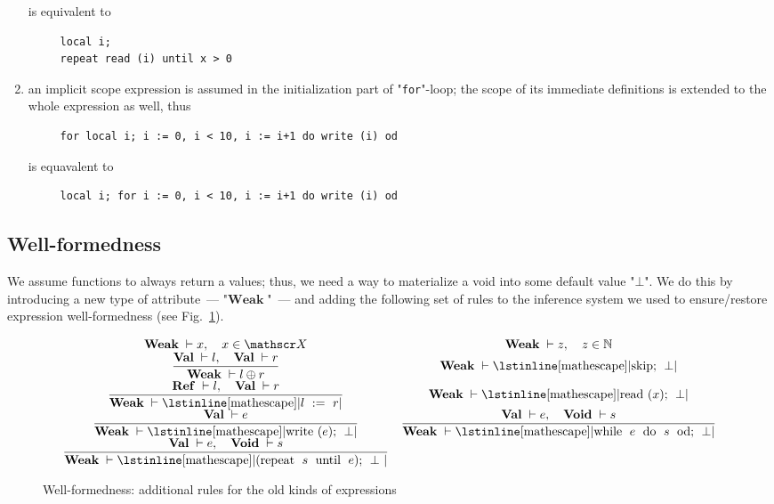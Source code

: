 \documentclass{article}
\newcommand{\trule}[2]{\dfrac{#1}{#2}}
\newcommand{\withenv}[2]{{#1}\vdash{#2}}
\newcommand{\llang}[1]{\mbox{\lstinline[mathescape]|#1|}}
\newcommand{\primi}[2]{\mathbf{#1}\;{#2}}
\theoremstyle{definition}
\begin{document}
\begin{enumerate}
  is equivalent to

  \begin{lstlisting}
     local i;
     repeat read (i) until x > 0
  \end{lstlisting}

\item an implicit scope expression is assumed in the initialization part of "\lstinline|for|"-loop; the scope of its immediate definitions
  is extended to the whole expression as well, thus

  \begin{lstlisting}
     for local i; i := 0, i < 10, i := i+1 do write (i) od
  \end{lstlisting}

  is equavalent to

  \begin{lstlisting}
     local i; for i := 0, i < 10, i := i+1 do write (i) od
  \end{lstlisting}

\end{enumerate}

\subsection{Well-formedness}

\newcommand{\Ref}{\primi{Ref}{}}
\newcommand{\Val}{\primi{Val}{}}
\newcommand{\Void}{\primi{Void}{}}
\newcommand{\Weak}{\primi{Weak}{}}

We assume functions to always return a values; thus, we need a way to materialize a void into some default value "$\bot$".  We
do this by introducing a new type of attribute~--- "$\Weak$"~--- and adding the following set of rules to
the inference system we used to ensure/restore expression well-formedness (see Fig.~\ref{well_formed_old}).

\begin{figure}[h]
\renewcommand{\arraystretch}{2}
\[
  \begin{array}{cc}
    \withenv{\Weak}{x},\quad x \in \mathscr X       & \withenv{\Weak}{z},\quad z \in \mathbb N \\
  \trule{\withenv{\Val}{l},\quad\withenv{\Val}{r}}
        {\withenv{\Weak}{l\oplus r}}               & \withenv{\Weak}{\llang{skip; $\;\bot$}} \\[2mm]
  \trule{\withenv{\Ref}{l},\quad\withenv{\Val}{r}}
        {\withenv{\Weak}{\llang{$l\;$ := $\; r$}}} & \withenv{\Weak}{\llang{read ($x$); $\;\bot$}} \\[2mm]
  \trule{\withenv{\Val}{e}}{\withenv{\Weak}{\llang{write ($e$); $\;\bot$}}} & \trule{\withenv{\Val}{e},\quad\withenv{\Void}{s}}{\withenv{\Weak}{\llang{while $\;e\;$ do $\;s\;$ od; $\;\bot$}}} \\[2mm]
  \trule{\withenv{\Val}{e},\quad\withenv{\Void}{s}}{\withenv{\Weak}{\llang{(repeat $\;s\;$ until $\;e$); $\;\bot$ }}} &
  \end{array}
  \]
  \caption{Well-formedness: additional rules for the old kinds of expressions}
  \label{well_formed_old}
\end{figure}
\end{document}
